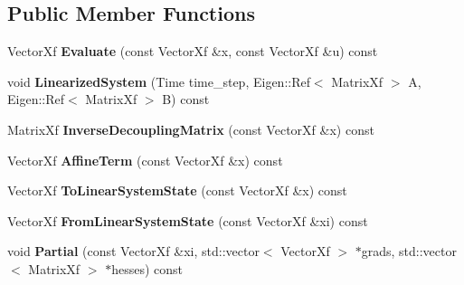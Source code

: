 \subsection*{Public Member Functions}
\begin{DoxyCompactItemize}
\item 
Vector\+Xf {\bfseries Evaluate} (const Vector\+Xf \&x, const Vector\+Xf \&u) const \hypertarget{classilqgames_1_1_single_player_flat_unicycle4_d_a8cb7d02af4f2ca075a63c0277cbf1212}{}\label{classilqgames_1_1_single_player_flat_unicycle4_d_a8cb7d02af4f2ca075a63c0277cbf1212}

\item 
void {\bfseries Linearized\+System} (Time time\+\_\+step, Eigen\+::\+Ref$<$ Matrix\+Xf $>$ A, Eigen\+::\+Ref$<$ Matrix\+Xf $>$ B) const \hypertarget{classilqgames_1_1_single_player_flat_unicycle4_d_a33f23530988ebefad6cf7f71a71fbe1c}{}\label{classilqgames_1_1_single_player_flat_unicycle4_d_a33f23530988ebefad6cf7f71a71fbe1c}

\item 
Matrix\+Xf {\bfseries Inverse\+Decoupling\+Matrix} (const Vector\+Xf \&x) const \hypertarget{classilqgames_1_1_single_player_flat_unicycle4_d_af5755f84b20abfed167035aa5380b19b}{}\label{classilqgames_1_1_single_player_flat_unicycle4_d_af5755f84b20abfed167035aa5380b19b}

\item 
Vector\+Xf {\bfseries Affine\+Term} (const Vector\+Xf \&x) const \hypertarget{classilqgames_1_1_single_player_flat_unicycle4_d_af7b121d4b464c453c125023f705557cf}{}\label{classilqgames_1_1_single_player_flat_unicycle4_d_af7b121d4b464c453c125023f705557cf}

\item 
Vector\+Xf {\bfseries To\+Linear\+System\+State} (const Vector\+Xf \&x) const \hypertarget{classilqgames_1_1_single_player_flat_unicycle4_d_abde027a03cb3886b23b89afd8dc789ed}{}\label{classilqgames_1_1_single_player_flat_unicycle4_d_abde027a03cb3886b23b89afd8dc789ed}

\item 
Vector\+Xf {\bfseries From\+Linear\+System\+State} (const Vector\+Xf \&xi) const \hypertarget{classilqgames_1_1_single_player_flat_unicycle4_d_ac0e69071e7afb0cbad008e032445abf7}{}\label{classilqgames_1_1_single_player_flat_unicycle4_d_ac0e69071e7afb0cbad008e032445abf7}

\item 
void {\bfseries Partial} (const Vector\+Xf \&xi, std\+::vector$<$ Vector\+Xf $>$ $\ast$grads, std\+::vector$<$ Matrix\+Xf $>$ $\ast$hesses) const \hypertarget{classilqgames_1_1_single_player_flat_unicycle4_d_a78781989d6608ca5004d67bfa14e643c}{}\label{classilqgames_1_1_single_player_flat_unicycle4_d_a78781989d6608ca5004d67bfa14e643c}


\end{DoxyCompactItemize}
